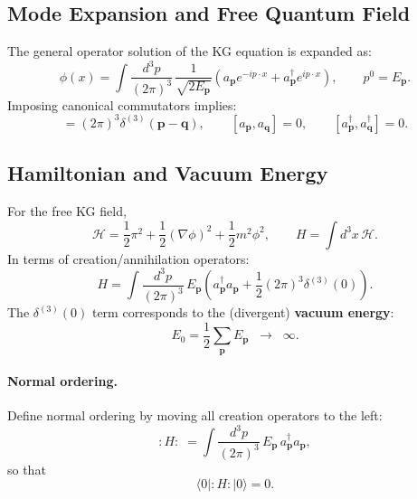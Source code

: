 \subsection{Mode Expansion and Free Quantum Field}
The general operator solution of the KG equation is expanded as:
\begin{equation}
\phi(x)=\int \frac{d^3p}{(2\pi)^3}\,\frac{1}{\sqrt{2E_{\mathbf{p}}}}
\left(
a_{\mathbf{p}}e^{-ip\cdot x}+a^\dagger_{\mathbf{p}}e^{ip\cdot x}
\right),
\qquad p^0=E_{\mathbf{p}}.
\end{equation}
Imposing canonical commutators implies:
\begin{equation}
[a_{\mathbf{p}},a^\dagger_{\mathbf{q}}]=(2\pi)^3\delta^{(3)}(\mathbf{p}-\mathbf{q}),
\qquad
[a_{\mathbf{p}},a_{\mathbf{q}}]=0,
\qquad
[a^\dagger_{\mathbf{p}},a^\dagger_{\mathbf{q}}]=0.
\end{equation}

\subsection{Hamiltonian and Vacuum Energy}
For the free KG field,
\begin{equation}
\mathcal{H}=\frac12\pi^2+\frac12(\nabla\phi)^2+\frac12 m^2\phi^2,
\qquad
H=\int d^3x\,\mathcal{H}.
\end{equation}
In terms of creation/annihilation operators:
\begin{equation}
H=\int \frac{d^3p}{(2\pi)^3}\,E_{\mathbf{p}}
\left(a^\dagger_{\mathbf{p}}a_{\mathbf{p}}+\frac12(2\pi)^3\delta^{(3)}(0)\right).
\end{equation}
The $\delta^{(3)}(0)$ term corresponds to the (divergent) \textbf{vacuum energy}:
\begin{equation}
E_0=\frac12\sum_{\mathbf{p}}E_{\mathbf{p}} \;\;\to\;\; \infty.
\end{equation}

\paragraph{Normal ordering.}
Define normal ordering by moving all creation operators to the left:
\begin{equation}
:H: \;=\int \frac{d^3p}{(2\pi)^3}\,E_{\mathbf{p}}\,a^\dagger_{\mathbf{p}}a_{\mathbf{p}},
\end{equation}
so that
\begin{equation}
\langle 0|:H:|0\rangle=0.
\end{equation}

